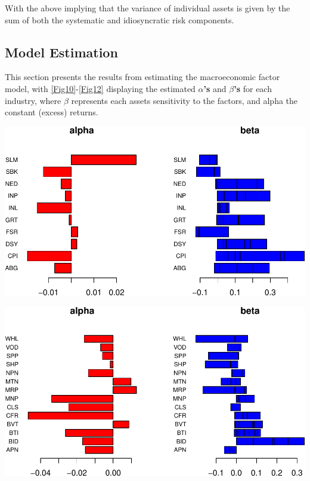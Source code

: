 \documentclass[11pt,preprint, authoryear]{elsarticle}
\let\origfigure\figure
\let\endorigfigure\endfigure
\renewenvironment{figure}[1][2] {
    \expandafter\origfigure\expandafter[H]
} {
    \endorigfigure
}
\numberwithin{equation}{section}
\numberwithin{figure}{section}
\numberwithin{table}{section}
\begin{document}
With the above implying that the variance of individual assets is given
by the sum of both the systematic and idiosyncratic risk components.

\hypertarget{model-estimation}{%
\subsection{\texorpdfstring{Model Estimation
\label{Est}}{Model Estimation }}\label{model-estimation}}

This section presents the results from estimating the macroeconomic
factor model, with \ref{Fig10}-\ref{Fig12} displaying the estimated
\textbf{\(\alpha\)'s} and \textbf{\(\beta\)'s} for each industry, where
\(\beta\) represents each assets sensitivity to the factors, and alpha
the constant (excess) returns.

\begin{figure}[H]
\includegraphics{Factor-Model_files/figure-latex/unnamed-chunk-12-1} \caption{Factor Analysis: Financials \label{Fig10}}\label{fig:unnamed-chunk-12}
\end{figure}

\begin{figure}[H]
\includegraphics{Factor-Model_files/figure-latex/unnamed-chunk-13-1} \caption{Factor Analysis: Industrial \label{Fig11}}\label{fig:unnamed-chunk-13}
\end{figure}
\end{document}
